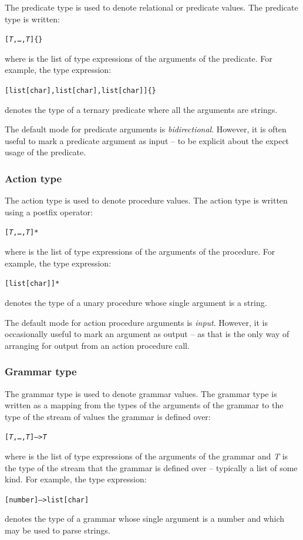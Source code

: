 The predicate type is used to denote relational or predicate values. The predicate type is written:
\begin{alltt}
[\emph{T},\ldots,\emph{T}]\{\}
\end{alltt}
where  is the list of type expressions of the arguments of the predicate. For example, the type expression:
\begin{alltt}
[list[char],list[char],list[char]]\{\}
\end{alltt}
denotes the type of a ternary predicate where all the arguments are strings.

The default mode for predicate arguments is \emph{bidirectional}. However, it is often useful to mark a predicate argument as input -- to be explicit about the expect usage of the predicate.


\subsubsection{Action type}
\label{types:standard:action}

The action type is used to denote procedure values. The action type is written using a postfix \q{*} operator:
\begin{alltt}
[\emph{T},\ldots,\emph{T}]*
\end{alltt}
where  is the list of type expressions of the arguments of the procedure. For example, the type expression:
\begin{alltt}
[list[char]]*
\end{alltt}
denotes the type of a unary procedure whose single argument is a string.

The default mode for action procedure arguments is \emph{input}. However, it is occasionally useful to mark an argument as output -- as that is the only way of arranging for output from an action procedure call.

\subsubsection{Grammar type}
\label{types:standard:grammar}

The grammar type is used to denote grammar values. The grammar type is written as a \q{-->} mapping from the types of the arguments of the grammar to the type of the stream of values the grammar is defined over:
\begin{alltt}
[\emph{T},\ldots,\emph{T}] --> \emph{T}
\end{alltt}
where  is the list of type expressions of the arguments of the grammar and \emph{T} is the type of the stream that the grammar is defined over -- typically a list of some kind. For example, the type expression:
\begin{alltt}
[number]-->list[char]
\end{alltt}
denotes the type of a grammar whose single argument is a number and which may be used to parse strings.

